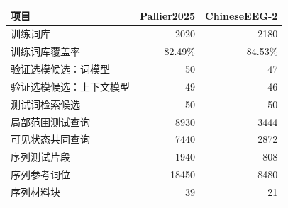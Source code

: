 \begingroup
\papertablestyle
\begin{tabular}{@{}lrr@{}}
\toprule
项目 & Pallier2025 & ChineseEEG-2 \\
\midrule
训练词库 & 2020 & 2180 \\
训练词库覆盖率 & 82.49\% & 84.53\% \\
验证选模候选：词模型 & 50 & 47 \\
验证选模候选：上下文模型 & 49 & 46 \\
测试词检索候选 & 50 & 50 \\
\addlinespace
局部范围测试查询 & 8930 & 3444 \\
可见状态共同查询 & 7440 & 2872 \\
序列测试片段 & 1940 & 808 \\
序列参考词位 & 18450 & 8480 \\
序列材料块 & 39 & 21 \\
\bottomrule
\end{tabular}
\endgroup
